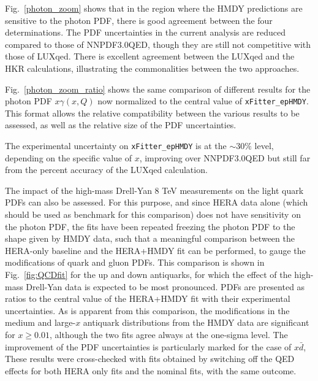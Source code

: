 Fig.~\ref{photon_zoom} shows that in the region
where the HMDY predictions are sensitive to the photon PDF, there is
good agreement between the four determinations.
%
The PDF uncertainties in the current
analysis are reduced compared to those of NNPDF3.0QED, though they are still not competitive with those
of LUXqed.
%
There is excellent agreement between the LUXqed and the HKR
calculations, illustrating the commonalities between the two
approaches.

Fig.~\ref{photon_zoom_ratio} shows the same comparison of
different results for the photon PDF $x\gamma(x,Q)$ now normalized to
the central value of {\tt xFitter\_epHMDY}.
%
This format allows the relative compatibility
between the various results to be assessed, as well as the relative size of the PDF
uncertainties.

The experimental uncertainty on {\tt xFitter\_epHMDY}
is at the $\sim 30\%$ level, depending on the specific value of $x$,
improving over NNPDF3.0QED but still far from the percent accuracy of
the LUXqed calculation.

The impact of the high-mass Drell-Yan 8 TeV measurements on
the light quark PDFs can also be assessed.
%
For this purpose, and since HERA data alone (which should be used as
benchmark for this comparison) does not have sensitivity on the photon
PDF, the fits have been repeated freezing the photon PDF to the
shape given by HMDY data, such that
a meaningful comparison between the HERA-only
baseline and the HERA+HMDY fit can be performed, to gauge the modifications of quark and
gluon PDFs.
%
This comparison is shown in Fig.~\ref{fig:QCDfit} for the up and down
antiquarks, for which the effect of the high-mass Drell-Yan data is
expected to be most pronounced. PDFs are presented as ratios to the
central value of the HERA+HMDY fit with their experimental uncertainties.
%
As is apparent from this comparison, the modifications in the medium
and large-$x$ antiquark distributions from the HMDY data are
significant for $x\ge 0.01$, although the two fits agree always at the
one-sigma level.
%
The improvement of the PDF
uncertainties is particularly marked for the case of $x\bar{d}$,
%
These results were cross-checked with fits obtained by switching
off the QED effects for both HERA only fits and the nominal fits, with
the same outcome.

